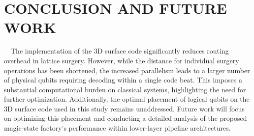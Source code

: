   \section{CONCLUSION AND FUTURE WORK}
  \vspace{-8pt}
  \ \ The implementation of the 3D surface code significantly reduces routing overhead in lattice surgery. However, while the distance for individual surgery operations has been shortened, the increased parallelism leads to a larger number of physical qubits requiring decoding within a single code beat. This imposes a substantial computational burden on classical systems, highlighting the need for further optimization. Additionally, the optimal placement of logical qubits on the 3D surface code used in this study remains unaddressed. Future work will focus on optimizing this placement and conducting a detailed analysis of the proposed magic-state factory's performance within lower-layer pipeline architectures.


\printbibliography

